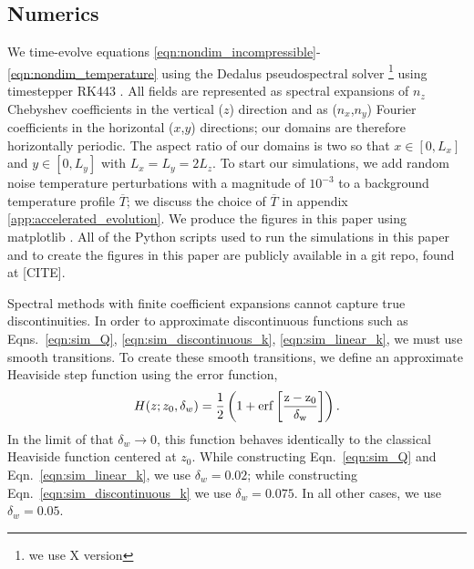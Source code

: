 \documentclass{aastex631}
\begin{document}
\subsection{Numerics}
We time-evolve equations \ref{eqn:nondim_incompressible}-\ref{eqn:nondim_temperature} using the Dedalus pseudospectral solver \citep{burns_etal_2020}\footnote{we use X version} using timestepper RK443 \citep{ascher_etal_1997}.
All fields are represented as spectral expansions of $n_z$ Chebyshev coefficients in the vertical ($z$) direction and as ($n_x$,$n_y$) Fourier coefficients in the horizontal ($x$,$y$) directions; our domains are therefore horizontally periodic.
The aspect ratio of our domains is two so that $x \in [0, L_x]$ and $y \in [0, L_y]$ with $L_x = L_y = 2 L_z$.
To start our simulations, we add random noise temperature perturbations with a magnitude of $10^{-3}$ to a background temperature profile $\overline{T}$; we discuss the choice of $\overline{T}$ in appendix \ref{app:accelerated_evolution}.
We produce the figures in this paper using matplotlib \citep{hunter2007, mpl3.3.4}.
All of the Python scripts used to run the simulations in this paper and to create the figures in this paper are publicly available in a git repo, found at [CITE].

Spectral methods with finite coefficient expansions cannot capture true discontinuities.
In order to approximate discontinuous functions such as Eqns.~\ref{eqn:sim_Q}, \ref{eqn:sim_discontinuous_k}, \ref{eqn:sim_linear_k}, we must use smooth transitions.
To create these smooth transitions, we define an approximate Heaviside step function using the error function,
\begin{equation}
H(z; z_0, \delta_w) = \frac{1}{2}\left(1 + \rm{erf}\left[\frac{z - z_0}{\delta_w}\right]\right).
\label{eqn:heaviside}
\end{equation}
In the limit of that $\delta_w \rightarrow 0$, this function behaves identically to the classical Heaviside function centered at $z_0$.
While constructing Eqn.~\ref{eqn:sim_Q} and Eqn.~\ref{eqn:sim_linear_k}, we use $\delta_w = 0.02$; while constructing Eqn.~\ref{eqn:sim_discontinuous_k} we use $\delta_w = 0.075$.
In all other cases, we use $\delta_w = 0.05$.
\end{document}
